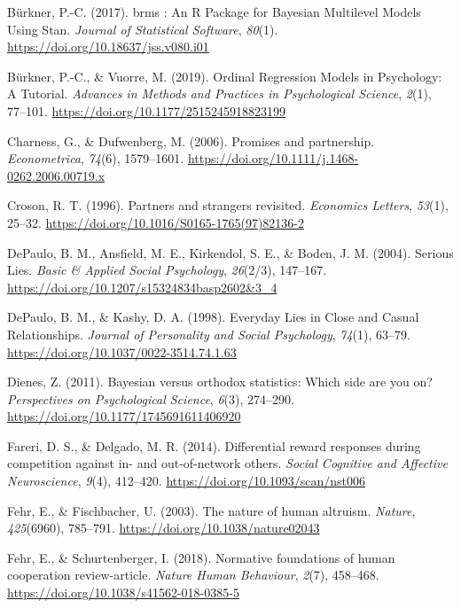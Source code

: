 \documentclass[12pt,]{article}
\begin{document}
\leavevmode\hypertarget{ref-Burkner2017}{}%
Bürkner, P.-C. (2017). brms : An R Package for Bayesian Multilevel
Models Using Stan. \emph{Journal of Statistical Software}, \emph{80}(1).
\url{https://doi.org/10.18637/jss.v080.i01}

\leavevmode\hypertarget{ref-Burkner2019}{}%
Bürkner, P.-C., \& Vuorre, M. (2019). Ordinal Regression Models in
Psychology: A Tutorial. \emph{Advances in Methods and Practices in
Psychological Science}, \emph{2}(1), 77--101.
\url{https://doi.org/10.1177/2515245918823199}

\leavevmode\hypertarget{ref-Charness2006}{}%
Charness, G., \& Dufwenberg, M. (2006). Promises and partnership.
\emph{Econometrica}, \emph{74}(6), 1579--1601.
\url{https://doi.org/10.1111/j.1468-0262.2006.00719.x}

\leavevmode\hypertarget{ref-Croson1996}{}%
Croson, R. T. (1996). Partners and strangers revisited. \emph{Economics
Letters}, \emph{53}(1), 25--32.
\url{https://doi.org/10.1016/S0165-1765(97)82136-2}

\leavevmode\hypertarget{ref-DePaulo2004}{}%
DePaulo, B. M., Ansfield, M. E., Kirkendol, S. E., \& Boden, J. M.
(2004). Serious Lies. \emph{Basic \& Applied Social Psychology},
\emph{26}(2/3), 147--167.
\url{https://doi.org/10.1207/s15324834basp2602\&3_4}

\leavevmode\hypertarget{ref-DePaulo1998}{}%
DePaulo, B. M., \& Kashy, D. A. (1998). Everyday Lies in Close and
Casual Relationships. \emph{Journal of Personality and Social
Psychology}, \emph{74}(1), 63--79.
\url{https://doi.org/10.1037/0022-3514.74.1.63}

\leavevmode\hypertarget{ref-Dienes2011}{}%
Dienes, Z. (2011). Bayesian versus orthodox statistics: Which side are
you on? \emph{Perspectives on Psychological Science}, \emph{6}(3),
274--290. \url{https://doi.org/10.1177/1745691611406920}

\leavevmode\hypertarget{ref-Fareri2014}{}%
Fareri, D. S., \& Delgado, M. R. (2014). Differential reward responses
during competition against in- and out-of-network others. \emph{Social
Cognitive and Affective Neuroscience}, \emph{9}(4), 412--420.
\url{https://doi.org/10.1093/scan/nst006}

\leavevmode\hypertarget{ref-Fehr2003}{}%
Fehr, E., \& Fischbacher, U. (2003). The nature of human altruism.
\emph{Nature}, \emph{425}(6960), 785--791.
\url{https://doi.org/10.1038/nature02043}

\leavevmode\hypertarget{ref-Fehr2018}{}%
Fehr, E., \& Schurtenberger, I. (2018). Normative foundations of human
cooperation review-article. \emph{Nature Human Behaviour}, \emph{2}(7),
458--468. \url{https://doi.org/10.1038/s41562-018-0385-5}
\end{document}
